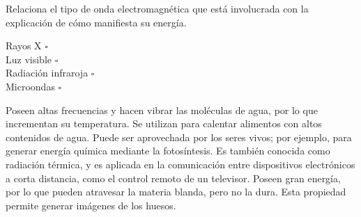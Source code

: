 Relaciona el tipo de onda electromagnética  que está involucrada con la  explicación de cómo manifiesta su energía.
\begin{multicols}{2}
    \begin{flushright}
        Rayos X $\square$\\                   \vspace{2cm}
        Luz visible $\square$\\               \vspace{2cm}
        Radiación infraroja $\square$\\       \vspace{2cm}
        Microondas $\square$\\                \vspace{2cm}
    \end{flushright}
    \vspace{1cm}
    \begin{checkboxes}
        \choice Poseen altas frecuencias y hacen vibrar las moléculas de agua, por lo que incrementan su temperatura. Se utilizan para calentar alimentos con altos contenidos de agua.
        \choice Puede ser aprovechada por los seres vivos; por ejemplo, para generar energía química mediante la fotosíntesis.
        \choice Es también conocida como radiación térmica, y es aplicada en la comunicación entre dispositivos electrónicos a corta distancia, como el control remoto de un televisor.
        \choice Poseen gran energía, por lo que pueden atravesar la materia blanda, pero no la dura. Esta propiedad permite generar imágenes de los huesos.
    \end{checkboxes}
\end{multicols}